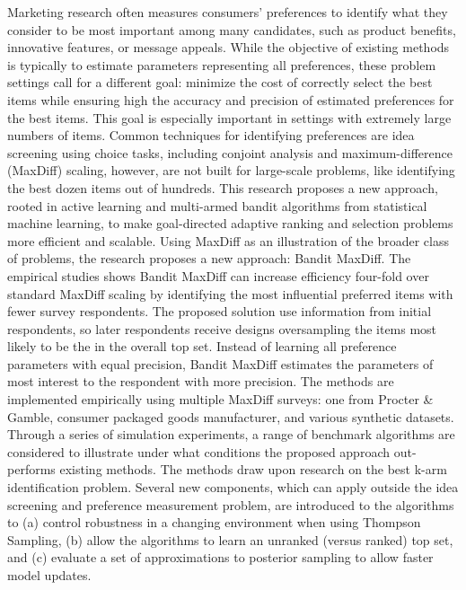 \documentclass[nonblindrev]{informs3}
\begin{document}
\ABSTRACT
{%
Marketing research often measures consumers' preferences to identify what they consider to be most important among many candidates, such as product benefits, innovative features, or message appeals. While the objective of existing methods is typically to estimate parameters representing all preferences, these problem settings call for a different goal: minimize the cost of correctly select the best items while ensuring high the accuracy and precision of estimated preferences for the best items. This goal is especially important in settings with extremely large numbers of items. Common techniques for identifying preferences are idea screening using choice tasks, including conjoint analysis and maximum-difference (MaxDiff) scaling, however, are not built for large-scale problems, like identifying the best dozen items out of hundreds. This research proposes a new approach, rooted in active learning and multi-armed bandit algorithms from statistical machine learning, to make goal-directed adaptive ranking and selection problems more efficient and scalable. Using MaxDiff as an illustration of the broader class of problems, the research proposes a new approach: Bandit MaxDiff. The empirical studies shows Bandit MaxDiff can increase efficiency four-fold over standard MaxDiff scaling by identifying the most influential preferred items with fewer survey respondents. The proposed solution use information from initial respondents, so later respondents receive designs oversampling the items most likely to be the in the overall top set. Instead of learning all preference parameters with equal precision, Bandit MaxDiff estimates the parameters of most interest to the respondent with more precision. The methods are implemented empirically using multiple MaxDiff surveys: one from Procter \& Gamble, consumer packaged goods manufacturer, and various synthetic datasets. Through a series of simulation experiments, a range of benchmark algorithms are considered to illustrate under what conditions the proposed approach out-performs existing methods. The methods draw upon research on the best k-arm identification problem. Several new components, which can apply outside the idea screening and preference measurement problem, are introduced to the algorithms to (a) control robustness in a changing environment when using Thompson Sampling, (b) allow the algorithms to learn an unranked (versus ranked) top set, and (c) evaluate a set of approximations to posterior sampling to allow faster model updates.

} ~ \\
\end{document}

